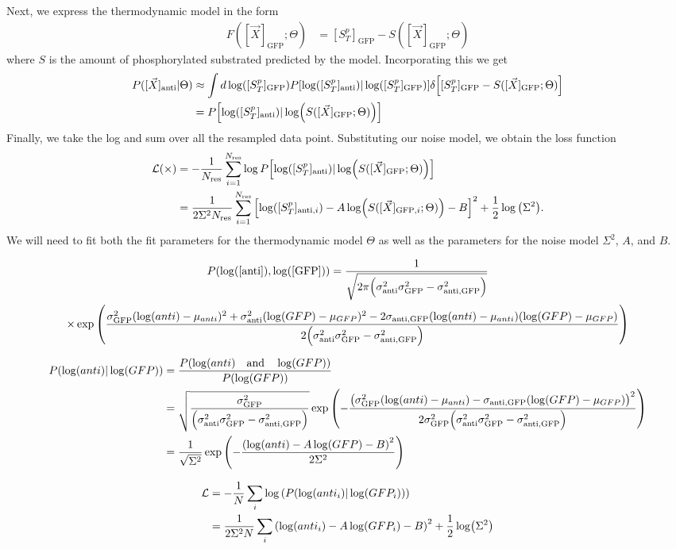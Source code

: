 \documentclass[aps,onecolumn,superscriptaddress,notitlepage]{revtex4-1}
\newcommand{\lGFP}{\log([\mathrm{GFP}])}
\newcommand{\lanti}{\log([\mathrm{anti}])}
\begin{document}
Next, we express the thermodynamic model in the form
\begin{align}
F([\vec{X}]_{\mathrm{GFP}};\Theta) &= [S_T^p]_{\mathrm{GFP}} - S([\vec{X}]_{\mathrm{GFP}};\Theta)
\end{align}
where $S$ is the amount of phosphorylated substrated predicted by the model.
Incorporating this we get
\begin{align}
P([\vec{X}]_{\mathrm{anti}} | \Theta ) &\approx   \int d\log([S_T^p]_{\mathrm{GFP}}) P\qty[\log([S_T^p]_{\mathrm{anti}}) | \log([S_T^p]_{\mathrm{GFP}})]\delta\qty[[S_T^p]_{\mathrm{GFP}} - S([\vec{X}]_{\mathrm{GFP}};\Theta)]\\
&=   P\qty[\log([S_T^p]_{\mathrm{anti}}) | \log(S([\vec{X}]_{\mathrm{GFP}};\Theta))]
\end{align} 
Finally, we take the log and sum over all the resampled data point. Substituting our noise model, we obtain the loss function
\begin{align}
\mathcal{L(\Theta)} &= -\frac{1}{N_{\mathrm{res}}}\sum_{i=1}^{N_{\mathrm{res}}}\log P\qty[\log([S_T^p]_{\mathrm{anti}}) | \log(S([\vec{X}]_{\mathrm{GFP}};\Theta))]\\
&= \frac{1}{2\Sigma^2N_{\mathrm{res}}}\sum_{i=1}^{N_{\mathrm{res}}}\qty[\log([S_T^p]_{\mathrm{anti}, i}) - A \log(S([\vec{X}]_{\mathrm{GFP}, i};\Theta)) - B]^2 + \frac{1}{2}\log\qty(\Sigma^2).
\end{align}
We will need to fit both the fit parameters for the thermodynamic model $\Theta$ as well as the parameters for the noise model $\Sigma^2$, $A$, and $B$.


\clearpage


\begin{gather}
P(\lanti, \lGFP) = \frac{1}{\sqrt{2\pi \qty(\sigma_{\mathrm{anti}}^2\sigma_{\mathrm{GFP}}^2 - \sigma_{\mathrm{anti}, \mathrm{GFP}}^2)}}\\
\times\exp\qty(\frac{\sigma_{\mathrm{GFP}}^2(\log(anti)-\mu_{anti})^2 + \sigma_{\mathrm{anti}}^2 (\log(GFP)-\mu_{GFP})^2 - 2\sigma_{\mathrm{anti}, \mathrm{GFP}}(\log(anti)-\mu_{anti})(\log(GFP)-\mu_{GFP})}{2\qty(\sigma_{\mathrm{anti}}^2\sigma_{\mathrm{GFP}}^2 - \sigma_{\mathrm{anti}, \mathrm{GFP}}^2)})
\end{gather}

\begin{align}
P(\log(anti)| \log(GFP)) &= \frac{P(\log(anti) \qand \log(GFP)) }{P(\log(GFP))}\\
&= \sqrt{\frac{\sigma_{\mathrm{GFP}}^2}{\qty(\sigma_{\mathrm{anti}}^2\sigma_{\mathrm{GFP}}^2 - \sigma_{\mathrm{anti}, \mathrm{GFP}}^2)}}  \exp\qty(-\frac{\qty(\sigma_{\mathrm{GFP}}^2(\log(anti)-\mu_{anti}) - \sigma_{\mathrm{anti}, \mathrm{GFP}} (\log(GFP)-\mu_{GFP}))^2}{2\sigma_{\mathrm{GFP}}^2\qty(\sigma_{\mathrm{anti}}^2\sigma_{\mathrm{GFP}}^2 - \sigma_{\mathrm{anti}, \mathrm{GFP}}^2)})\\
&= \frac{1}{\sqrt{\Sigma^2}}\exp\qty(-\frac{\qty(\log(anti)-A\log(GFP)-B)^2}{2\Sigma^2})
\end{align}

\begin{align}
\mathcal{L} &= -\frac{1}{N}\sum_i\log\qty(P(\log(anti_i)| \log(GFP_i)))\\
 &=  \frac{1}{2\Sigma^2N}\sum_i\qty(\log(anti_i)-A\log(GFP_i)-B)^2 +\frac{1}{2}\log(\Sigma^2)
\end{align}
\end{document}
